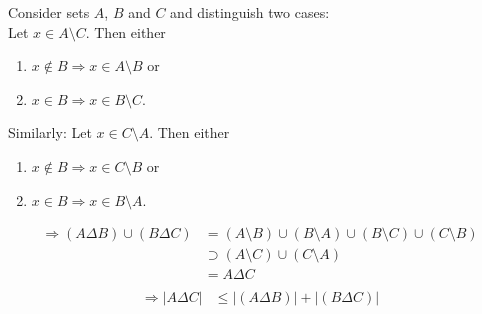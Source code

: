 \documentclass[10pt,a4paper,boxed]{hmcpset}
\begin{document}
\begin{solution}
\begin{enumerate}[(i)]
\begin{description}
							Consider sets $A$, $B$ and $C$ and distinguish two cases:\\
							Let $x\in A \setminus C$. Then either
							\begin{enumerate}
								\item $x \notin B \Rightarrow x \in A \setminus B$ or
								\item $x \in B \Rightarrow x \in B \setminus C$.
							\end{enumerate}
							Similarly: Let $x\in C \setminus A$. Then either
							\begin{enumerate}
								\item $x \notin B \Rightarrow x \in C \setminus B$ or
								\item $x \in B \Rightarrow x \in B \setminus A$.
							\end{enumerate}
							\begin{align}
								\Rightarrow (A \Delta B) \cup (B \Delta C) &= (A \setminus B) \cup (B \setminus A) \cup (B \setminus C ) \cup (C \setminus B)  \\
								&\supset (A \setminus C) \cup (C \setminus A)  \\
								&=  A \Delta C  \\
							\end{align}
							\begin{align}
								\Rightarrow  \left\vert A \Delta C \right\vert &\leq \left\vert (A \Delta B) \right\vert + \left\vert (B \Delta C) \right\vert
							\end{align}
					\end{description}
			\end{enumerate}
		\end{solution}

	
\end{document}
